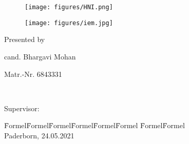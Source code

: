 
\begin{titlepage}
\begin{figure}[htb]
\centering
\begin{addmargin*}[0cm]{0cm} %
\begin{minipage}[b]{0.5\textwidth} %
\flushleft
  \texttt{[image: figures/HNI.png]}
\end{minipage}
\hspace{.01\linewidth}
\begin{minipage}[b]{.5\textwidth}
\begin{addmargin*}[0cm]{-0.5cm} %
\flushright
  \texttt{[image: figures/iem.jpg]}
\end{addmargin*}
 \end{minipage}
\end{addmargin*}

 \end{figure}
\sffamily

\vspace*{3.5cm}
\fontsize{24pt}{26pt}\selectfont
\begin{center}
\textbf{\ausarbeitungsTyp}


\Large
\textbf{\meinTitel}
\vspace*{3cm}

\normalsize
Presented by
\vspace*{0.5cm}

cand. Bhargavi Mohan

Matr.-Nr. 6843331 
\vspace*{1.5cm}

\large
\textbf{~}
\end{center}
\vspace*{2cm}
\normalsize
Supervisor:

\begin{tabbing}
\quad\=Formel\quad\= Formel\quad\= Formel\quad\= Formel\quad\= Formel\quad\= Formel \quad\= Formel\quad\= Formel\kill  
\meinErstgutachter\\
\meinZweitgutachter \>\>\>\>\>\>\> Paderborn, 24.05.2021
\end{tabbing}
\normalsize
\vfill
\newpage
\thispagestyle{empty}    %
\vspace*{16.5cm}


\end{titlepage}

